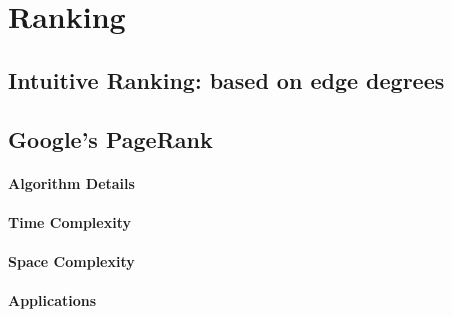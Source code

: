 \documentclass[12pt]{article}
\begin{document}
\section{Ranking}

\subsection{Intuitive Ranking: based on edge degrees}



\subsection{Google's PageRank}

\paragraph{Algorithm Details}



\paragraph{Time Complexity}
\paragraph{Space Complexity}
\paragraph{Applications}
\end{document}
